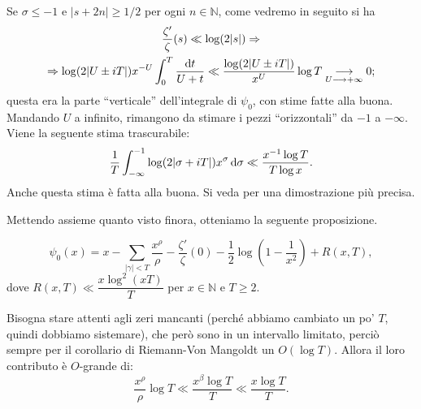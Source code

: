 \begin{oss} \label{zeeeta}
  Se $\sigma \le -1$ e $|s+2n| \ge 1/2$ per ogni $n \in \mathbb{N}$, come vedremo in seguito si ha
  \begin{gather*}
    \frac{\zeta'}{\zeta}(s) \ll \log(2|s|) \Rightarrow \\
    \Rightarrow \log(2|U\pm iT|)x^{-U}\int_0^T \frac{\mathop{}\!\mathrm{d} t}{U+t} \ll \frac{\log(2|U\pm iT|)}{x^U}\log{T} \underset{U \longrightarrow +\infty}{\longrightarrow} 0;
  \end{gather*}
  questa era la parte ``verticale'' dell'integrale di $\psi_0$, con stime fatte alla buona. Mandando $U$ a infinito, rimangono da stimare i pezzi ``orizzontali'' da $-1$ a $-\infty$. Viene la seguente stima trascurabile:
  $$\frac{1}{T}\int_{-\infty}^{-1} \log(2|\sigma+iT|)x^{\sigma}\mathop{}\!\mathrm{d} \sigma \ll \frac{x^{-1}\log{T}}{T\log{x}}.$$
  Anche questa stima è fatta alla buona. Si veda \cite{D} per una dimostrazione più precisa.
\end{oss}

Mettendo assieme quanto visto finora, otteniamo la seguente proposizione.

\begin{prop}
  \begin{equation*}
    \psi_0(x)=x-\sum_{|\gamma| < T} \frac{x^{\rho}}{\rho}-\frac{\zeta'}{\zeta}(0)-\frac{1}{2}\log\left(1-\frac{1}{x^2}\right)+R(x,T),
  \end{equation*}
  dove $R(x,T) \ll \dfrac{x\log^2(xT)}{T}$ per $x \in \mathbb{N}$ e $T \ge 2$.
\end{prop}

Bisogna stare attenti agli zeri mancanti (perché abbiamo cambiato un po' $T$, quindi dobbiamo sistemare), che però sono in un intervallo limitato, perciò sempre per il corollario di Riemann-Von Mangoldt un $O(\log{T})$. Allora il loro contributo è $O$-grande di:
$$\frac{x^{\rho}}{\rho}\log{T} \ll \frac{x^{\beta}\log{T}}{T} \ll \frac{x\log{T}}{T}.$$

